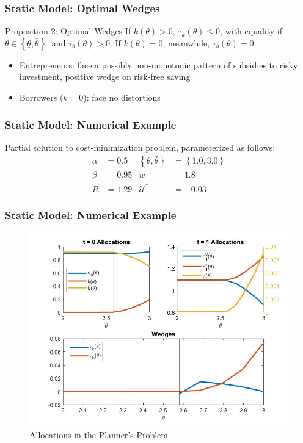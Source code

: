 \documentclass{beamer}
\begin{document}
\begin{frame}
    \frametitle{Static Model: Optimal Wedges}

    \begin{block}{Proposition 2: Optimal Wedges}
        If \( k\left( \theta \right) > 0 \), \( \tau_k\left( \theta \right) \le 0 \), with equality if \( \theta \in \left\{ \underline{\theta}, \bar{\theta}\right\} \), and \( \tau_b\left( \theta \right) > 0 \). If \( k\left( \theta \right) = 0 \), meanwhile, \( \tau_b\left( \theta \right) = 0 \).
    \end{block}

    \begin{itemize}
        \item Entrepreneurs: face a possibly non-monotonic pattern of subsidies to risky investment, positive wedge on risk-free saving 
        \item Borrowers (\( k=0 \)): face no distortions
    \end{itemize}

\end{frame}

\begin{frame}
    \frametitle{Static Model: Numerical Example}

    Partial solution to cost-minimization problem, parameterized as follows: 
    \begin{align*}
        \alpha &= 0.5 & \left\{\underline{\theta}, \bar{\theta}\right\} &= \left\{ 1.0,3.0\right\} \\
        \beta &= 0.95 & w &= 1.8 \\
        R &= 1.29 & \mathcal{U}^* &= -0.03
    \end{align*}

\end{frame}

\begin{frame}
    \frametitle{Static Model: Numerical Example}

    \begin{figure}[!htbp]
        \centering
        \caption{Allocations in the Planner's Problem}
        \includegraphics[width = 0.9\columnwidth]{figures/allocs_rlow.jpg}
    \end{figure}

\end{frame}
\end{document}
